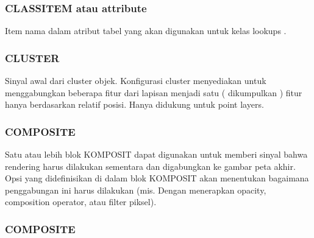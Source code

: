   \subsubsection{CLASSITEM atau attribute}
  Item nama dalam atribut tabel yang akan digunakan untuk kelas lookups .
  \subsubsection{CLUSTER}
  Sinyal awal dari cluster objek. Konfigurasi cluster menyediakan untuk menggabungkan beberapa fitur dari lapisan menjadi satu ( dikumpulkan ) fitur  hanya berdasarkan relatif posisi. Hanya didukung untuk point layers.
  \subsubsection{COMPOSITE}
  Satu atau lebih blok KOMPOSIT dapat digunakan untuk memberi sinyal bahwa rendering harus dilakukan sementara dan digabungkan ke gambar peta akhir. 
  Opsi yang didefinisikan di dalam blok KOMPOSIT akan menentukan bagaimana penggabungan ini harus dilakukan (mis. Dengan menerapkan opacity, composition operator, atau filter piksel).
  \subsubsection{COMPOSITE}


